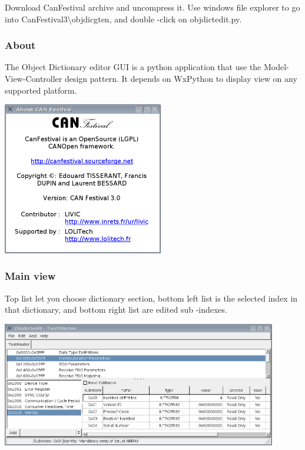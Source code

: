 \documentclass[12pt,english,a4paper]{book}
\begin{document}
Download CanFestival archive and uncompress it. Use windows file explorer
to go into CanFestival3\textbackslash{}objdicgten, and double -click
on objdictedit.py.

\subsubsection{About}

The Object Dictionary editor GUI is a python application that use
the Model-View-Controller design pattern. It depends on WxPython to
display view on any supported platform.

\begin{center}
\includegraphics[width=7cm]{Pictures/10000201000001FC000001E5D65E8766} 
\par\end{center}


\subsubsection{Main view}

Top list let you choose dictionary section, bottom left list is the
selected index in that dictionary, and bottom right list are edited
sub -indexes.

\begin{center}
\includegraphics[width=12cm]{Pictures/10000201000003E7000001C7B0296577} 
\par\end{center}
\end{document}
